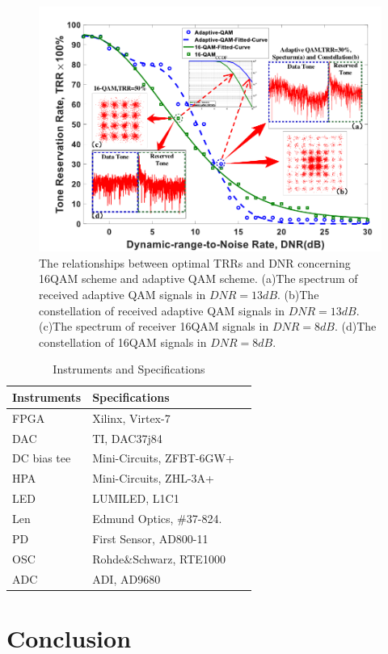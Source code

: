 \documentclass[9pt,twocolumn,twoside]{osajnl}
\begin{document}
\begin{figure}[t]
  \centering
  \includegraphics[width=\linewidth]{figures/DNR_TRR.pdf}
  \caption{The relationships between optimal TRRs and DNR concerning 16QAM scheme and adaptive QAM scheme. (a)The spectrum of received adaptive QAM signals in $DNR=13dB$. (b)The constellation of 
  received adaptive QAM signals in $DNR=13dB$. 
  (c)The spectrum of receiver 16QAM signals in $DNR=8dB$. (d)The constellation of 16QAM signals in $DNR=8dB$.}
  \label{fig:DNR_TRR}
\end{figure}

\begin{table}[htb]
  \caption{Instruments and Specifications}
  \begin{tabular*}{8cm}{lll}
  \hline
  Instruments & Specifications \\
  \hline
  FPGA & Xilinx, Virtex-7 \\
  DAC & TI, DAC37j84 \\
  DC bias tee & Mini-Circuits, ZFBT-6GW+ \\
  HPA & Mini-Circuits, ZHL-3A+ \\
  LED & LUMILED, L1C1 \\
  Len & Edmund Optics, \#37-824. \\
  PD & First Sensor, AD800-11 \\
  OSC & Rohde\&Schwarz, RTE1000 \\
  ADC & ADI, AD9680 \\
  \hline
  \end{tabular*}
  \label{tab:dev}
\end{table}

\section{Conclusion}
\end{document}
